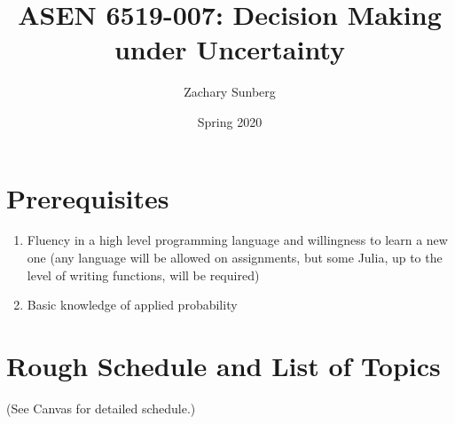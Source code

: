 \documentclass[9pt]{article}
\title{ASEN 6519-007: Decision Making under Uncertainty}
\author{Zachary Sunberg}
\date{Spring 2020}
\begin{document}
\maketitle

\section*{Prerequisites}

\begin{enumerate}[noitemsep]
    \item Fluency in a high level programming language and willingness to learn a new one (any language will be allowed on assignments, but some Julia, up to the level of writing functions, will be required)
    \item Basic knowledge of applied probability
\end{enumerate}

\section*{Rough Schedule and List of Topics}

(See Canvas for detailed schedule.)
\end{document}
